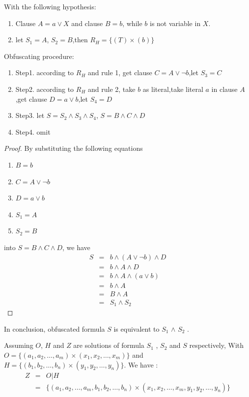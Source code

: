 \documentclass[runningheads,a4paper]{llncs}
\begin{document}
\begin{theorem}
With the following hypothesis: 
\begin{enumerate}
\item Clause $A=a\vee X$ and clause $B=b$, while $b$ is not variable in $X$.
\item let $S_1=A$, $S_2=B$,then $R_H=\{(T)\times(b)\}$ 
\end{enumerate}

\noindent Obfuscating procedure:
\begin{enumerate}
\item{Step1}. according to $R_H$ and rule 1, get clause $C=A\vee \neg b$,let $S_3=C$
\item{Step2}. according to $R_H$ and rule 2, take $b$ as literal,take literal $a$ in clause $A$,get clause $D=a\vee b$,let $S_4=D$
\item{Step3}. let $S=S_2 \wedge S_3\wedge S_4$, $S=B\wedge C\wedge D$
\item{Step4}. omit
\end{enumerate}
\end{theorem}

\begin{proof}

By substituting the following equations
\begin{enumerate}
 \item $B=b$ 
 \item $C=A\vee \neg b$
 \item $D=a\vee b$
 \item $S_1=A$
 \item $S_2=B$
\end{enumerate}
into $S=B\wedge C\wedge D$,
we have 
\begin{eqnarray}
S & = & b\wedge (A\vee \neg b)\wedge D\nonumber\\
  & = & b\wedge A\wedge D \nonumber\\
  & = & b\wedge A\wedge (a\vee b)\\
  & = & b\wedge A\nonumber\\
  & = & B\wedge A\nonumber\\
  & = & S_1 \wedge S_2\nonumber
\end{eqnarray}


\end{proof}

In conclusion, obfuscated formula $S$ is equivalent to $S_1$ $\wedge$  $S_2$ .

Assuming $O$, $H$ and $Z$ are  solutions of formula $S_1$ , $S_2$ and $S$ respectively,
With $O=\{(a_1,a_2,\dots,a_m)\times(x_1,x_2,\dots,x_m)\}$ and $H=\{(b_1,b_2,\dots,b_n)\times(y_1,y_2,\dots,y_n)\}$.
We have :
\begin{eqnarray}
Z & = & O|H \nonumber\\
  & = & \{(a_1,a_2,\dots,a_m,b_1,b_2,\dots,b_n)\times(x_1,x_2,\dots,x_m,y_1,y_2,\dots,y_n)\}
\end{eqnarray}
\end{document}
